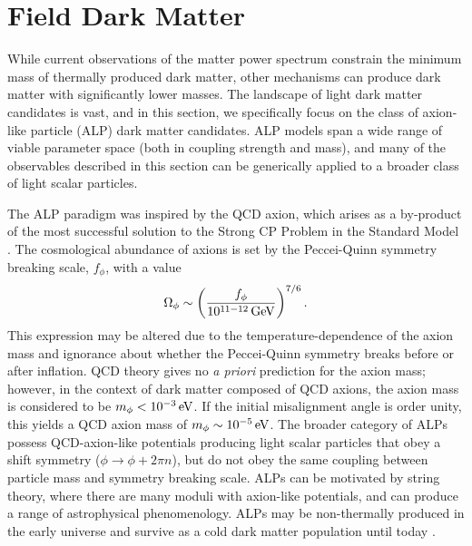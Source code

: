 \section{Field Dark Matter }
\label{sec:axions}

While current observations of the matter power spectrum constrain the minimum mass of thermally produced dark matter, other mechanisms can  produce dark matter with significantly lower masses. The landscape of light dark matter candidates is vast, and in this section, we specifically focus on the class of axion-like particle (ALP) dark matter candidates.
ALP models span a wide range of viable parameter space (both in coupling strength and mass), and many of the observables described in this section can be generically applied to a broader class of light scalar particles.

The ALP paradigm was inspired by the QCD axion, which arises as a by-product of the most successful solution to the Strong CP Problem in the Standard Model \citep{PecceiQuinn:1977}. 
The cosmological abundance of axions is set by the Peccei-Quinn symmetry breaking scale, $f_\phi$, with a value
\begin{equation}
\Omega_\phi\sim\left(\frac{f_\phi}{10^{11-12}\,{\rm GeV}}\right)^{7/6}.
\end{equation}
This expression may be altered due to the temperature-dependence of the axion mass and ignorance about whether the Peccei-Quinn symmetry breaks before or after inflation. 
QCD theory gives no {\it a priori} prediction for the axion mass; however, in the context of dark matter composed of QCD axions, the axion mass is considered to be $m_\phi< 10^{-3} \mathrm{\,eV}$. %
If the initial misalignment angle is order unity, this yields a QCD axion mass of $m_\phi \sim 10^{-5} \mathrm{\,eV}$. %
The broader category of ALPs possess QCD-axion-like potentials producing light scalar particles that obey a shift symmetry ($\phi \rightarrow \phi + 2\pi n$), but do not obey the same coupling between particle mass and symmetry breaking scale. 
ALPs can be motivated by string theory, where there are many moduli with axion-like potentials, and can produce a range of astrophysical phenomenology.
ALPs may be non-thermally produced in the early universe and survive as a cold dark matter population until today \citep[\eg][]{Arias:2012az}.



